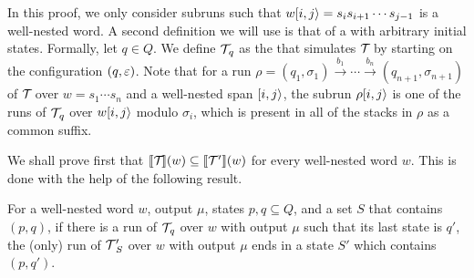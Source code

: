 	In this proof, we only consider subruns such that $w[i,j\rangle = s_{i}s_{i+1}\cdots s_{j-1}$ is a well-nested word. 
	A second definition we will use is that of a \vpann with arbitrary initial states. 
	Formally, let $q\in Q$. 
	We define $\mathcal{T}\!_{q}$ as the \vpann that simulates $\mathcal{T}\!$ by starting on the configuration $(q,\varepsilon)$. 
	Note that for a run $\rho = (q_1, \sigma_1) \xrightarrow{b_1} \cdots  \xrightarrow{b_n} (q_{n+1}, \sigma_{n+1})$ of $\mathcal{T}\!$ over $w = s_1\cdots s_n$ and a well-nested span $[i,j\rangle$, the subrun $\rho[i,j\rangle$ is one of the runs of $\mathcal{T}\!_{q}$ over $w[i,j\rangle$ modulo $\sigma_i$, which is present in all of the stacks in $\rho$ as a common suffix.
	
	We shall prove first that $\llbracket \mathcal{T}\! \rrbracket(w) \subseteq \llbracket \mathcal{T}\!\,' \rrbracket(w)$ for every well-nested word $w$. This is done with the help of the following result.
	
	\begin{claim}
		For a well-nested word $w$, output $\mu$, states $p,q\subseteq Q$, and a set $S$ that contains $(p,q)$, if there is a run of $\mathcal{T}\!_q$ over $w$ with output $\mu$ such that its last state is $q'$, the (only) run of $\mathcal{T}\!\,'_{S}$ over $w$ with output $\mu$ ends in a state $S'$ which contains $(p,q')$.
	\end{claim}
	
